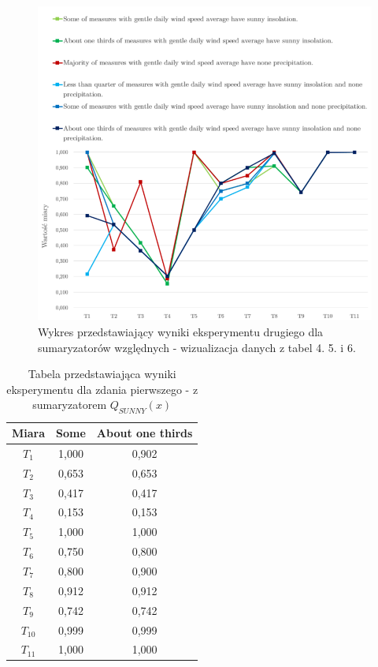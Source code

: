 \documentclass{classrep}
\begin{document}
\begin{figure}[H]
	\centering
	\includegraphics[width=1\textwidth]{Pictures/ResultCharts/Eks2_1.png}
	\caption{Wykres przedstawiający wyniki eksperymentu drugiego dla sumaryzatorów względnych - wizualizacja danych z tabel 4. 5. i 6.}
\end{figure}

\begin{table}[H]
	\centering
	\begin{tabular}{c c c} 
		\hline
		\textbf{Miara}  & {Some} & {About one thirds}\\ [0.5ex] 
		\hline
		\hline
$T_1$	&	1,000	&	0,902	\\
$T_2$	&	0,653	&	0,653	\\
$T_3$	&	0,417	&	0,417	\\
$T_4$	&	0,153	&	0,153	\\
$T_5$	&	1,000	&	1,000	\\
$T_6$	&	0,750	&	0,800	\\
$T_7$	&	0,800	&	0,900	\\
$T_8$	&	0,912	&	0,912	\\
$T_9$	&	0,742	&	0,742	\\
$T_{10}$	&	0,999	&	0,999	\\
$T_{11}$	&	1,000	&	1,000	\\
		\hline
	\end{tabular}
	\caption{Tabela przedstawiająca wyniki eksperymentu dla zdania pierwszego - z sumaryzatorem $Q_{\textit{SUNNY}}(x)$}
\end{table}
\end{document}
